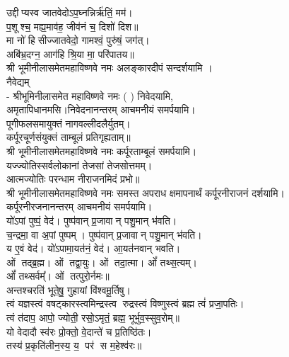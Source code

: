 उद्दीप्यस्व जातवेदोऽप॒घ्नन्निर्ऋ॑तिं॒ मम॑।\\
 प॒शूश्च॒ मह्य॒माव॑ह॒ जीव॑नं च॒ दिशो॑ दिश॥ \\
मा नो॑ हिसीज्जातवेदो॒ गामश्वं॒ पुरु॑षं॒ जग॑त्।\\
अबि॑भ्र॒दग्न॒ आग॑हि श्रि॒या मा॒ परि॑पातय॥ \\
श्री भूमीनीलासमेतमहाविष्णवे नमः अलङ्कारदीपं सन्दर्शयामि ।\\

नैवेद्यम्\\
- श्रीभूमिनीलासमेत महाविष्णवे नमः (	) निवेदयामि, \\
अमृतापिधानमसि।निवेदनानन्तरम् आचमनीयं समर्पयामि।\\

पूगीफलसमायुक्तं नागवल्लीदलैर्युतम्।\\
कर्पूरचूर्णसंयुक्तं ताम्बूलं प्रतिगृह्यताम्॥\\
श्री भूमीनीलासमेतमहाविष्णवे नमः कर्पूरताम्बूलं समर्पयामि।\\

यज्ज्योतिस्सर्वलोकानां तेजसां तेजसोत्तमम्।\\
आत्मज्योतिः परन्धाम नीराजनमिदं प्रभो॥\\
श्री भूमीनीलासमेतमहाविष्णवे नमः समस्त अपराध क्षमापनार्थं कर्पूरनीराजनं दर्शयामि।\\
कर्पूरनीरजनानन्तरम् आचमनीयं समर्पयामि।\\

 यो॑ऽपां पुष्पं॒ वेद॑। पुष्प॑वान् प्र॒जावान् पशु॒मान् भ॑वति।\\
च॒न्द्रमा॒ वा अ॒पां पुष्पम्। पुष्प॑वान् प्र॒जावान् पशु॒मान् भ॑वति।\\
य ए॒वं वेद॑। यो॑ऽपामा॒यत॑नं॒ वेद॑। आ॒यत॑नवान् भवति।\\

ओं तद्ब्र॒ह्म। ओं तद्वा॒युः। ओं तदा॒त्मा। ओं᳚ तथ्स॒त्यम्‌।\\
ओं᳚ तथ्सर्वम्᳚‌। ओं तत्पुरो॒र्नमः॥\\

अन्तश्चरति॑ भूते॒षु॒ गुहायां वि॑श्वमू॒र्तिषु। \\
त्वं यज्ञस्त्वं वषट्कारस्त्वमिन्द्रस्त्व रुद्रस्त्वं विष्णुस्त्वं ब्रह्म त्वं॑ प्रजा॒पतिः। \\
त्वं त॑दाप॒ आपो॒ ज्योती॒ रसो॒ऽमृतं॒ ब्रह्म॒ भूर्भुव॒स्सुव॒रोम्‌॥\\

यो वेदादौ स्व॑रः प्रो॒क्तो॒ वे॒दान्ते॑ च प्र॒तिष्ठि॑तः।\\
तस्य॑ प्र॒कृति॑लीन॒स्य॒ य॒ पर॑ स म॒हेश्व॑रः॥\\

